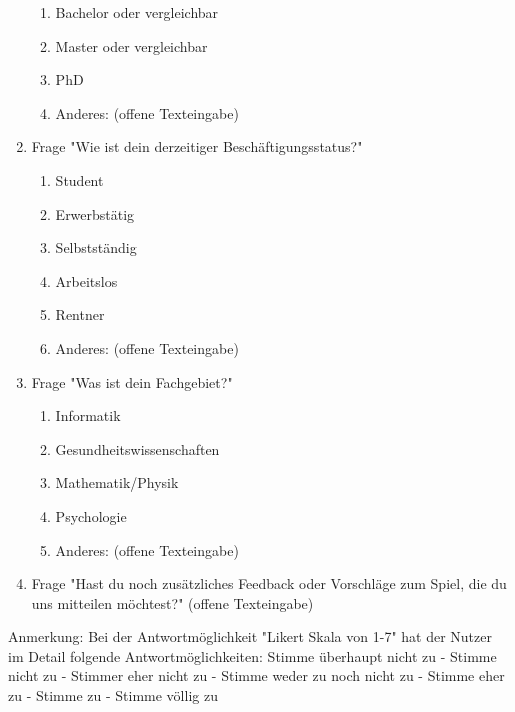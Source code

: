 \begin{enumerate}
\begin{enumerate}
        \item Bachelor oder vergleichbar
        \item Master oder vergleichbar
        \item PhD
        \item Anderes: (offene Texteingabe)
    \end{enumerate}
    \item Frage "Wie ist dein derzeitiger Beschäftigungsstatus?"
    \begin{enumerate}
        \item Student
        \item Erwerbstätig
        \item Selbstständig
        \item Arbeitslos
        \item Rentner
        \item Anderes: (offene Texteingabe)
    \end{enumerate}
    \item Frage "Was ist dein Fachgebiet?"
    \begin{enumerate}
        \item Informatik
        \item Gesundheitswissenschaften
        \item Mathematik/Physik
        \item Psychologie
        \item Anderes: (offene Texteingabe)
    \end{enumerate}
    \item Frage "Hast du noch zusätzliches Feedback oder Vorschläge zum Spiel, die du uns mitteilen möchtest?" (offene Texteingabe)	
\end{enumerate}
Anmerkung: Bei der Antwortmöglichkeit "Likert Skala von 1-7" hat der Nutzer im Detail folgende Antwortmöglichkeiten: 
Stimme überhaupt nicht zu - Stimme nicht zu - Stimmer eher nicht zu - Stimme weder zu noch nicht zu - Stimme eher zu - Stimme zu - Stimme völlig zu
